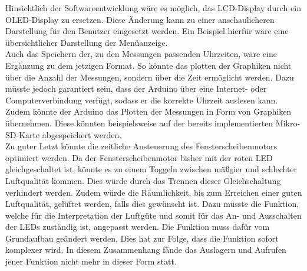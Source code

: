 \label{AusblickSW}

Hinsichtlich der Softwareentwicklung wäre es möglich, das \ac{LCD}-Display durch ein \ac{OLED}-Display zu ersetzen. Diese Änderung kann zu einer anschaulicheren Darstellung für den Benutzer eingesetzt werden. Ein Beispiel hierfür wäre eine übersichtlicher Darstellung der Menüanzeige. \\
Auch das Speichern der, zu den Messungen passenden Uhrzeiten, wäre eine Ergänzung zu dem jetzigen Format. So könnte das plotten der Graphiken nicht über die Anzahl der Messungen, sondern über die Zeit ermöglicht werden. Dazu müsste jedoch garantiert sein, dass der Arduino über eine Internet- oder Computerverbindung verfügt, sodass er die korrekte Uhrzeit auslesen kann. \\
Zudem könnte der Arduino das Plotten der Messungen in Form von Graphiken übernehmen. Diese könnten beispielsweise auf der bereits implementierten Mikro-SD-Karte abgespeichert werden. \\
Zu guter Letzt könnte die zeitliche Ansteuerung des Fensterscheibenmotors optimiert werden. Da der Fensterscheibenmotor bisher mit der roten \ac{LED} gleichgeschaltet ist, könnte es zu einem Toggeln zwischen mäßgier und schlechter Luftqualität kommen. Dies würde durch das Trennen dieser Gleichschaltung verhindert werden. Zudem würde die Räumlichkeit, bis zum Erreichen einer guten Luftqualität, gelüftet werden, falls dies gewünscht ist. Dazu müsste die Funktion, welche für die Interpretation der Luftgüte und somit für das An- und Ausschalten der \ac{LED}s zuständig ist, angepasst werden. Die Funktion muss dafür vom Grundaufbau geändert werden. Dies hat zur Folge, dass die Funktion sofort komplexer wird. In diesem Zusammenhang fände das Auslagern und Aufrufen jener Funktion nicht mehr in dieser Form statt.